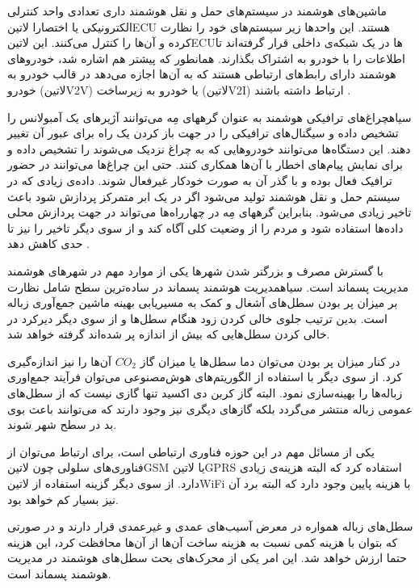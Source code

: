 ماشین‌های هوشمند در سیستم‌های حمل و نقل هوشمند داری تعدادی واحد کنترلی الکترونیکی یا اختصارا ‌لاتین{ECU} هستند. این واحدها زیر سیستم‌های خود را نظارت کرده و آن‌ها را کنترل می‌کنند.
این ‌لاتین{ECU}ها در یک شبکه‌ی داخلی قرار گرفته‌اند تا اطلاعات را با خودرو به اشتراک بگذارند. همانطور که پیشتر هم اشاره شد، خودروهای هوشمند دارای رابط‌های ارتباطی هستند که به آن‌ها اجازه می‌دهد
در قالب خودرو به خودرو (‌لاتین{V2V}) یا خودرو به زیرساخت (‌لاتین{V2I}) ارتباط داشته باشند
.

‌سیاه{چراغ‌های ترافیکی} هوشمند به عنوان گرههای مِه می‌توانند آژیرهای یک آمبولانس را تشخیص داده و سیگنال‌های ترافیکی را در جهت باز کردن یک راه برای عبور آن تغییر دهند.
این دستگاه‌ها می‌توانند خودروهایی که به چراغ نزدیک می‌شوند را تشخیص داده و برای نمایش پیام‌های اخطار با آن‌ها همکاری کنند.
حتی این چراغ‌ها می‌توانند در حضور ترافیک فعال بوده و با گذر آن به صورت خودکار غیرفعال شوند.
داده‌ی زیادی که در سیستم حمل و نقل هوشمند تولید می‌شود اگر در یک ابر متمرکز پردازش شود باعث تاخیر زیادی می‌شود.
بنابراین گرههای مِه در چهارراه‌ها می‌تواند در جهت پردازش محلی داده‌ها استفاده شود و مردم را از وضعیت کلی آگاه کند و از سوی دیگر تاخیر را نیز تا حدی کاهش دهد
.

با گسترش مصرف و بزرگتر شدن شهرها یکی از موارد مهم در شهرهای هوشمند مدیریت پسماند است. ‌سیاه{مدیریت هوشمند پسماند} در ساده‌ترین سطح شامل نظارت بر میزان پر بودن سطل‌های آشغال
و کمک به مسیریابی بهینه ماشین جمع‌آوری زباله است. بدین ترتیب جلوی خالی کردن زود هنگام سطل‌ها و از سوی دیگر دیرکرد در خالی کردن سطل‌هایی که بیش از اندازه پر شده‌اند گرفته خواهد شد.

در کنار میزان پر بودن می‌توان دما سطل‌ها یا میزان گاز $CO_{2}$ آن‌ها را نیز اندازه‌گیری کرد. از سوی دیگر با استفاده از الگوریتم‌های هوش‌مصنوعی می‌توان فرآیند جمع‌اوری زباله‌ها را بهینه‌سازی نمود.
البته گاز کربن دی اکسید تنها گازی نیست که از سطل‌های عمومی زباله منتشر می‌گردد بلکه گازهای دیگری نیز وجود دارند که می‌توانند باعث بوی بد در سطح شهر شوند.

یکی از مسائل مهم در این حوزه فناوری ارتباطی است، برای ارتباط می‌توان از فناوری‌های سلولی چون ‌لاتین{GSM} یا ‌لاتین{GPRS} استفاده کرد که البته هزینه‌ی زیادی دارد.
از سوی دیگر گزینه استفاده از ‌لاتین{WiFi} با هزینه پایین وجود دارد که البته برد آن نیز بسیار کم خواهد بود.

سطل‌های زباله همواره در معرض آسیب‌های عمدی و غیرعمدی قرار دارند و در صورتی که بتوان با هزینه کمی نسبت به هزینه ساخت آن‌ها از آن‌ها محافظت کرد، این هزینه حتما ارزش خواهد شد.
این امر یکی از محرک‌های بحث سطل‌های هوشمند در مدیریت هوشمند پسماند است.

